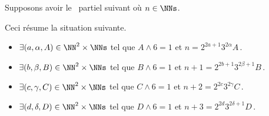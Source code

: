 

\begin{example}
	Supposons avoir le \sftab\ partiel suivant où $n \in \NNs$.

	\begin{center}
	\end{center}

	\newpage
	Ceci résume la situation suivante.
	\begin{itemize}
		\item $\exists (a, \alpha, A) \in \NN^2 \times \NNs$
		      tel que $A \wedge 6 = 1$
		      et
		      $n     = 2^{2a+1} 3^{2\alpha} A$\,.

		\item $\exists (b, \beta, B) \in \NN^2 \times \NNs$
		      tel que $B \wedge 6 = 1$
		      et
		      $n + 1 = 2^{2b+1} 3^{2\beta+1} B$\,.

		\item $\exists (c, \gamma, C) \in \NN^2 \times \NNs$
		      tel que $C \wedge 6 = 1$
		      et
		      $n + 2 = 2^{2c} 3^{2\gamma} C$\,.

		\item $\exists (d, \delta, D) \in \NN^2 \times \NNs$
		      tel que $D \wedge 6 = 1$
		      et
		      $n + 3 = 2^{2d} 3^{2\delta+1} D$\,.
	\end{itemize}
\end{example}




